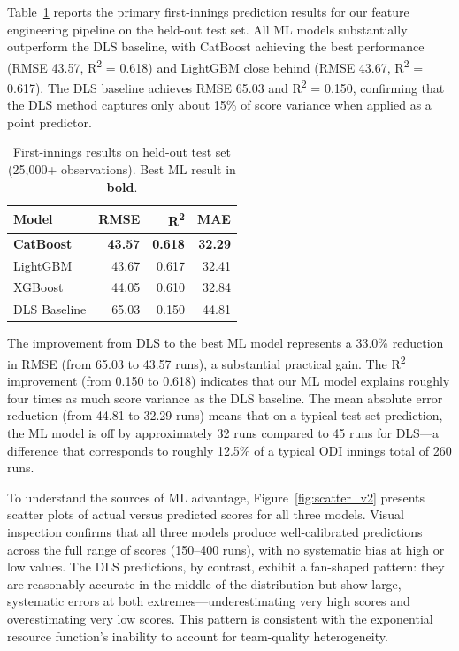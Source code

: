 \documentclass[10pt,a4paper,twocolumn]{article}
\begin{document}
Table~\ref{tab:inn1_v2} reports the primary first-innings prediction results for our feature engineering pipeline on the held-out test set. All ML models substantially outperform the DLS baseline, with CatBoost achieving the best performance (RMSE 43.57, R\textsuperscript{2} = 0.618) and LightGBM close behind (RMSE 43.67, R\textsuperscript{2} = 0.617). The DLS baseline achieves RMSE 65.03 and R\textsuperscript{2} = 0.150, confirming that the DLS method captures only about 15\% of score variance when applied as a point predictor.

\begin{table}[H]
\centering
\caption{First-innings results on held-out test set (25,000+ observations). Best ML result in \textbf{bold}.}
\label{tab:inn1_v2}
\small
\begin{tabular}{@{}lrrr@{}}
\toprule
\textbf{Model} & \textbf{RMSE} & \textbf{R\textsuperscript{2}} & \textbf{MAE} \\
\midrule
\textbf{CatBoost}   & \textbf{43.57} & \textbf{0.618} & \textbf{32.29} \\
LightGBM            & 43.67 & 0.617 & 32.41 \\
XGBoost             & 44.05 & 0.610 & 32.84 \\
\midrule
DLS Baseline           & 65.03 & 0.150 & 44.81 \\
\bottomrule
\end{tabular}
\end{table}

The improvement from DLS to the best ML model represents a 33.0\% reduction in RMSE (from 65.03 to 43.57 runs), a substantial practical gain. The R\textsuperscript{2} improvement (from 0.150 to 0.618) indicates that our ML model explains roughly four times as much score variance as the DLS baseline. The mean absolute error reduction (from 44.81 to 32.29 runs) means that on a typical test-set prediction, the ML model is off by approximately 32 runs compared to 45 runs for DLS---a difference that corresponds to roughly 12.5\% of a typical ODI innings total of 260 runs.

To understand the sources of ML advantage, Figure~\ref{fig:scatter_v2} presents scatter plots of actual versus predicted scores for all three models. Visual inspection confirms that all three models produce well-calibrated predictions across the full range of scores (150--400 runs), with no systematic bias at high or low values. The DLS predictions, by contrast, exhibit a fan-shaped pattern: they are reasonably accurate in the middle of the distribution but show large, systematic errors at both extremes---underestimating very high scores and overestimating very low scores. This pattern is consistent with the exponential resource function's inability to account for team-quality heterogeneity.
\end{document}
